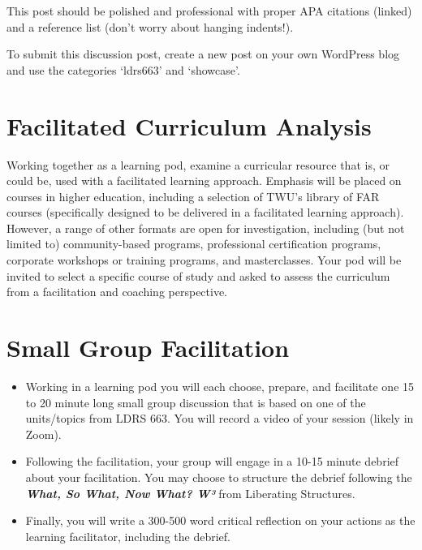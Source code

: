 \documentclass[
]{book}
\providecommand{\tightlist}{%
  \setlength{\itemsep}{0pt}\setlength{\parskip}{0pt}}
\begin{document}
This post should be polished and professional with proper APA citations (linked) and a reference list (don't worry about hanging indents!).

To submit this discussion post, create a new post on your own WordPress blog and use the categories `ldrs663' and `showcase'.

\hypertarget{facilitated-curriculum-analysis}{%
\section*{Facilitated Curriculum Analysis}\label{facilitated-curriculum-analysis}}

Working together as a learning pod, examine a curricular resource that is, or could be, used with a facilitated learning approach. Emphasis will be placed on courses in higher education, including a selection of TWU's library of FAR courses (specifically designed to be delivered in a facilitated learning approach). However, a range of other formats are open for investigation, including (but not limited to) community-based programs, professional certification programs, corporate workshops or training programs, and masterclasses. Your pod will be invited to select a specific course of study and asked to assess the curriculum from a facilitation and coaching perspective.

\hypertarget{small-group-facilitation}{%
\section*{Small Group Facilitation}\label{small-group-facilitation}}

\begin{itemize}
\tightlist
\item
  Working in a learning pod you will each choose, prepare, and facilitate one 15 to 20 minute long small group discussion that is based on one of the units/topics from LDRS 663. You will record a video of your session (likely in Zoom).\\
\item
  Following the facilitation, your group will engage in a 10-15 minute debrief about your facilitation. You may choose to structure the debrief following the \textbf{\emph{What, So What, Now What? W³}} from Liberating Structures.\\
\item
  Finally, you will write a 300-500 word critical reflection on your actions as the learning facilitator, including the debrief.
\end{itemize}
\end{document}
